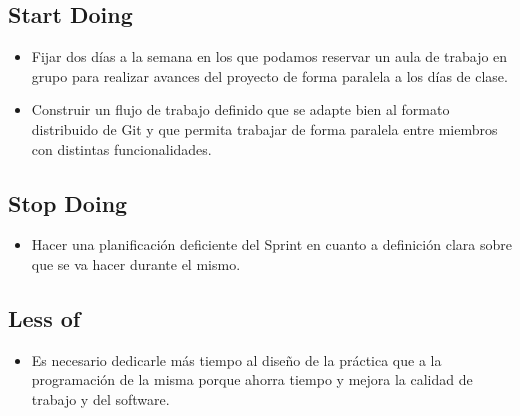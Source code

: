 \documentclass{article}
\begin{document}
\subsection{Start Doing}
\begin{itemize}
\item Fijar dos días a la semana en los que podamos reservar un aula de trabajo en grupo para realizar avances del proyecto de forma paralela a los días de clase.

\item Construir un flujo de trabajo definido que se adapte bien al formato distribuido de Git y que permita trabajar de forma paralela entre miembros con distintas funcionalidades.
\end{itemize}

\subsection{Stop Doing}
\begin{itemize}
\item Hacer una planificación deficiente del Sprint en cuanto a definición clara sobre que se va hacer durante el mismo.
\end{itemize}

\subsection{Less of}
\begin{itemize}
\item Es necesario dedicarle más tiempo al diseño de la práctica que a la programación de la misma porque ahorra tiempo y mejora la calidad de trabajo y del software.
\end{itemize}
\end{document}
